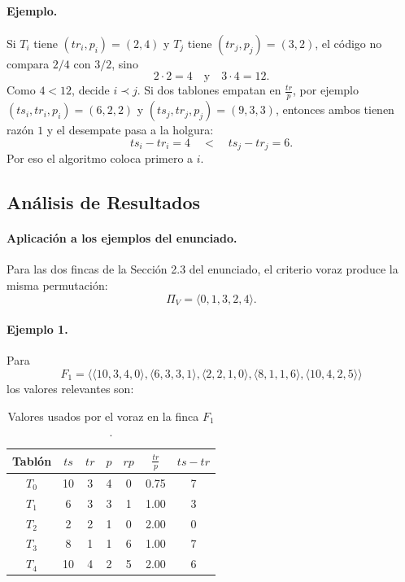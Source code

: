 \documentclass[12pt,a4paper]{article}
\begin{document}
\paragraph{Ejemplo.}
Si \(T_i\) tiene \((tr_i,p_i)=(2,4)\) y \(T_j\) tiene \((tr_j,p_j)=(3,2)\), el c\'odigo no compara \(2/4\) con \(3/2\), sino
\[
2\cdot 2 = 4
\quad\text{y}\quad
3\cdot 4 = 12.
\]
Como \(4<12\), decide \(i \prec j\). Si dos tablones empatan en \(\frac{tr}{p}\), por ejemplo \((ts_i,tr_i,p_i)=(6,2,2)\) y \((ts_j,tr_j,p_j)=(9,3,3)\), entonces ambos tienen raz\'on \(1\) y el desempate pasa a la holgura:
\[
ts_i-tr_i = 4
\quad<\quad
ts_j-tr_j = 6.
\]
Por eso el algoritmo coloca primero a \(i\).

\subsection{An\'alisis de Resultados}

\paragraph{Aplicaci\'on a los ejemplos del enunciado.}
Para las dos fincas de la Secci\'on 2.3 del enunciado, el criterio voraz produce la misma permutaci\'on:
\[
\Pi_V = \langle 0,1,3,2,4 \rangle.
\]

\paragraph{Ejemplo 1.}
Para
\[
F_1=\langle\langle 10,3,4,0\rangle,\langle 6,3,3,1\rangle,\langle 2,2,1,0\rangle,\langle 8,1,1,6\rangle,\langle 10,4,2,5\rangle\rangle
\]
los valores relevantes son:

\begin{table}[ht]
  \centering
  \small
  \begin{tabular}{ccccccc}
    \toprule
    Tabl\'on & \(ts\) & \(tr\) & \(p\) & \(rp\) & \(\frac{tr}{p}\) & \(ts-tr\) \\
    \midrule
    \(T_0\) & 10 & 3 & 4 & 0 & 0.75 & 7 \\
    \(T_1\) & 6 & 3 & 3 & 1 & 1.00 & 3 \\
    \(T_2\) & 2 & 2 & 1 & 0 & 2.00 & 0 \\
    \(T_3\) & 8 & 1 & 1 & 6 & 1.00 & 7 \\
    \(T_4\) & 10 & 4 & 2 & 5 & 2.00 & 6 \\
    \bottomrule
  \end{tabular}
  \caption{Valores usados por el voraz en la finca \(F_1\).}
\end{table}
\end{document}
